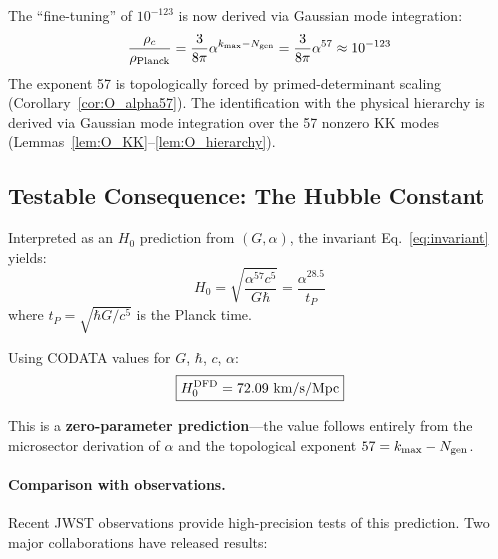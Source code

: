 \begin{tcolorbox}[colback=blue!5!white, colframe=blue!60!black, title=Cosmological Constant: Spectral-Action-Derived Resolution (Appendix~\ref{app:O_alpha57_clean})]
The ``fine-tuning'' of $10^{-123}$ is now derived via Gaussian mode integration:
\begin{equation}
\frac{\rho_c}{\rho_{\rm Planck}} = \frac{3}{8\pi}\alpha^{k_{\max} - N_{\rm gen}} = \frac{3}{8\pi}\alpha^{57} \approx 10^{-123}
\end{equation}
The exponent 57 is topologically forced by primed-determinant scaling (Corollary~\ref{cor:O_alpha57}). The identification with the physical hierarchy is derived via Gaussian mode integration over the 57 nonzero KK modes (Lemmas~\ref{lem:O_KK}--\ref{lem:O_hierarchy}).
\end{tcolorbox}

\subsection{Testable Consequence: The Hubble Constant}

Interpreted as an $H_0$ prediction from $(G, \alpha)$, the invariant Eq.~\eqref{eq:invariant} yields:
\begin{equation}
H_0 = \sqrt{\frac{\alpha^{57} c^5}{G\hbar}} = \frac{\alpha^{28.5}}{t_P}
\label{eq:H0-prediction}
\end{equation}
where $t_P = \sqrt{\hbar G/c^5}$ is the Planck time.

Using CODATA values for $G$, $\hbar$, $c$, $\alpha$:
\begin{equation}
\boxed{H_0^{\rm DFD} = 72.09~\text{km/s/Mpc}}
\label{eq:H0-DFD-value}
\end{equation}

This is a \textbf{zero-parameter prediction}---the value follows entirely from the microsector derivation of $\alpha$ and the topological exponent $57 = k_{\max} - N_{\rm gen}$.

\paragraph{Comparison with observations.}
Recent JWST observations provide high-precision tests of this prediction. Two major collaborations have released results:

